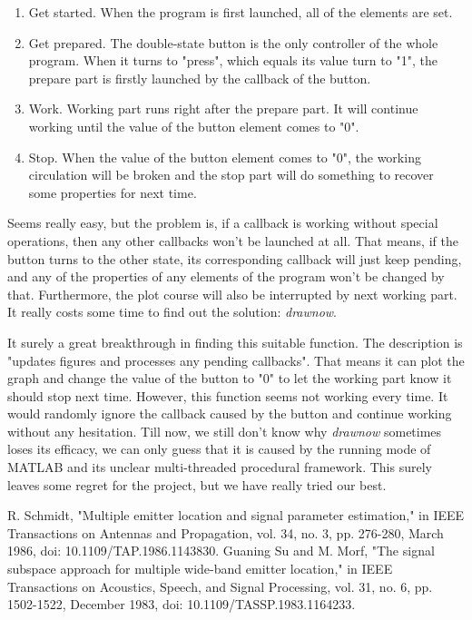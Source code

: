 \documentclass[UTF8]{article}
\begin{document}
\begin{enumerate}
\item
  Get started. When the program is first launched, all of the elements
  are set.
\item
  Get prepared. The double-state button is the only controller of the
  whole program. When it turns to "press", which equals its value turn
  to "1", the prepare part is firstly launched by the callback of the
  button.
\item
  Work. Working part runs right after the prepare part. It will continue
  working until the value of the button element comes to "0".
\item
  Stop. When the value of the button element comes to "0", the working
  circulation will be broken and the stop part will do something to
  recover some properties for next time.
\end{enumerate}

Seems really easy, but the problem is, if a callback is working without
special operations, then any other callbacks won't be launched at all.
That means, if the button turns to the other state, its corresponding
callback will just keep pending, and any of the properties of any
elements of the program won't be changed by that. Furthermore, the plot
course will also be interrupted by next working part. It really costs
some time to find out the solution: \emph{drawnow}.

It surely a great breakthrough in finding this suitable function. The
description is "updates figures and processes any pending callbacks".
That means it can plot the graph and change the value of the button to
"0" to let the working part know it should stop next time. However, this
function seems not working every time. It would randomly ignore the
callback caused by the button and continue working without any
hesitation. Till now, we still don't know why \emph{drawnow} sometimes
loses its efficacy, we can only guess that it is caused by the running
mode of MATLAB and its unclear multi-threaded procedural framework. This
surely leaves some regret for the project, but we have really tried our
best.

\begin{thebibliography}{2}
     R. Schmidt, "Multiple emitter location and signal parameter estimation," in IEEE Transactions on Antennas and Propagation, vol. 34, no. 3, pp. 276-280, March 1986, doi: 10.1109/TAP.1986.1143830.
     Guaning Su and M. Morf, "The signal subspace approach for multiple wide-band emitter location," in IEEE Transactions on Acoustics, Speech, and Signal Processing, vol. 31, no. 6, pp. 1502-1522, December 1983, doi: 10.1109/TASSP.1983.1164233.
\end{thebibliography}
\end{document}
